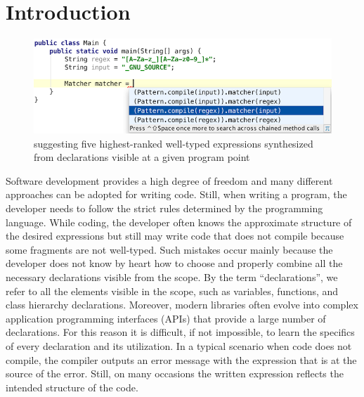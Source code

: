 \section{Introduction}
\label{sec:intro}

\begin{figure}[!tbh]
\centering
\includegraphics[natwidth=\textwidth]{RegexMatcher.png}
\caption{{\ourTool} suggesting five highest-ranked 
well-typed expressions synthesized from declarations visible at a given program point\label{fig:screenshot1}}
\end{figure}


Software development provides a high degree of freedom and many different approaches can be adopted for writing code. Still, when writing a program, the developer needs to follow the strict rules determined by the programming language. While coding, the developer often knows the approximate structure of the desired expressions but still may write code that does not compile because some fragments are not well-typed. Such mistakes occur mainly because the developer does not know by heart how to choose and properly combine all the necessary declarations visible from the scope. By the term ``declarations'', we refer to all the elements visible in the scope, such as variables, functions, and class hierarchy declarations. Moreover, modern libraries often evolve into complex application programming interfaces (APIs) that provide a large number of declarations. For this reason it is difficult, if not impossible, to learn the specifics of every declaration and its utilization. In a typical scenario when code does not compile, the compiler outputs an error message with the expression that is at the source of the error. Still, on many occasions the written expression reflects the intended structure of the code. 

